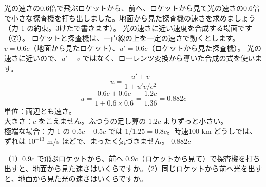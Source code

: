 \label{ph:原-11:ex7}
\begin{phreidai}
光の速さの0.6倍で飛ぶロケットから、前へ、ロケットから見て光の速さの0.6倍で小さな探査機を打ち出しました。地面から見た探査機の速さを求めましょう（力-1 の約束。3けたで書きます）。
\phbamen
光の速さに近い速度を合成する場面です（⑦）。
\phmushi
ロケットと探査機は、一直線の上を一定の速さで動くとします。
\phzu
$v=0.6c$（地面から見たロケット）、$u'=0.6c$（ロケットから見た探査機）。
\phriyu
光の速さに近いので、$u'+v$ ではなく、ローレンツ変換から導いた合成の式を使います。
\phtateru
\[ u=\frac{u'+v}{1+u'v/c^2} \]
\phtoku
\[ u=\frac{0.6c+0.6c}{1+0.6\times0.6}=\frac{1.2c}{1.36}=0.882c \]
\phtashikame
単位：両辺とも速さ。\\
大きさ：$c$ をこえません。ふつうの足し算の $1.2c$ よりずっと小さい。\\
極端な場合：力-1 の $0.5c+0.5c$ では $1/1.25=0.8c$。時速100 km どうしでは、ずれは $10^{-13}$ m/s ほどで、まったく気づきません。
\kotae $0.882c$
\end{phreidai}
\begin{jibun}
（1）$0.9c$ で飛ぶロケットから、前へ $0.9c$（ロケットから見て）で探査機を打ち出すと、地面から見た速さはいくらですか。（2）同じロケットから前へ光を出すと、地面から見た光の速さはいくらですか。
\end{jibun}

